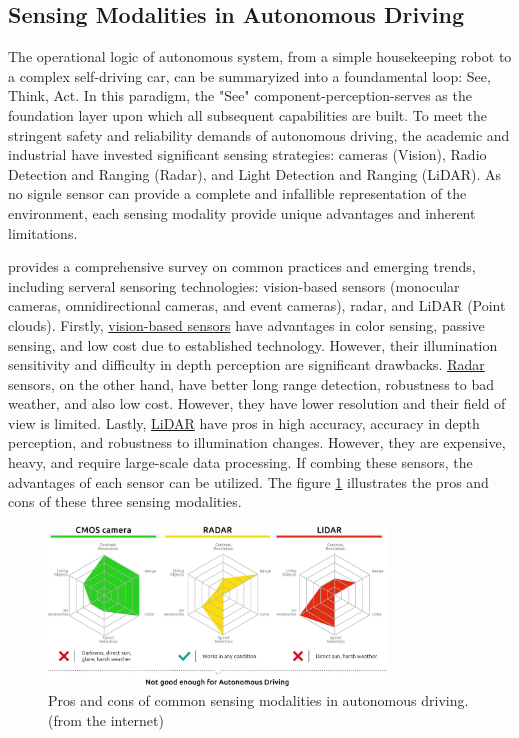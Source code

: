 \documentclass{article}
\begin{document}
\subsection{Sensing Modalities in Autonomous Driving}

The operational logic of autonomous system, from a simple housekeeping robot to a complex self-driving car, can be summaryized into a foundamental loop: See, Think, Act. In this paradigm, the "See" component-perception-serves as the foundation layer upon which all subsequent capabilities are built. To meet the stringent safety and reliability demands of autonomous driving, the academic and industrial have invested significant sensing strategies: cameras (Vision), Radio Detection and Ranging (Radar), and Light Detection and Ranging (LiDAR). As no signle sensor can provide a complete and infallible representation of the environment, each sensing modality provide unique advantages and inherent limitations.

\citet{yurtsever2020survey} provides a comprehensive survey on common practices and emerging trends, including serveral sensoring technologies: vision-based sensors (monocular cameras, omnidirectional cameras, and event cameras), radar, and LiDAR (Point clouds). Firstly, \underline{vision-based sensors} have advantages in color sensing, passive sensing, and low cost due to established technology. However, their illumination sensitivity and difficulty in depth perception are significant drawbacks. \underline{Radar} sensors, on the other hand, have better long range detection, robustness to bad weather, and also low cost. However, they have lower resolution and their field of view is limited. Lastly, \underline{LiDAR} have pros in high accuracy, accuracy in depth perception, and robustness to illumination changes. However, they are expensive, heavy, and require large-scale data processing. If combing these sensors, the advantages of each sensor can be utilized. The figure \ref{fig:sensing_modalities} illustrates the pros and cons of these three sensing modalities.

\begin{figure}[h]
    \centering
    \includegraphics[width=0.8\textwidth]{./pics/3_sensors.png}
    \caption{Pros and cons of common sensing modalities in autonomous driving. (from the internet)}
    \label{fig:sensing_modalities}
\end{figure}
\end{document}
